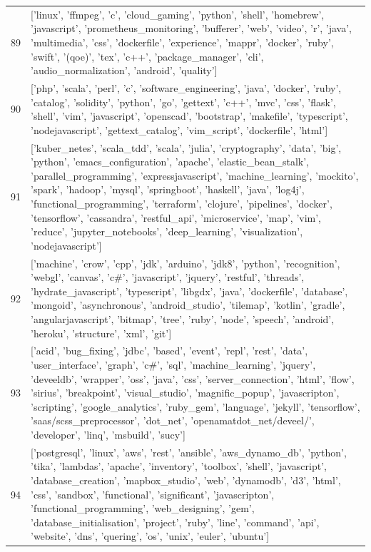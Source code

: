 \begin{center}
\begin{longtable}{|p{1.5cm}|p{12.5cm}|}
            89 & ['linux', 'ffmpeg', 'c', 'cloud\_gaming', 'python', 'shell', 'homebrew', 'javascript', 'prometheus\_monitoring', 'bufferer', 'web', 'video', 'r', 'java', 'multimedia', 'css', 'dockerfile', 'experience', 'mappr', 'docker', 'ruby', 'swift', '(qoe)', 'tex', 'c++', 'package\_manager', 'cli', 'audio\_normalization', 'android', 'quality']  \\ 
            90 & ['php', 'scala', 'perl', 'c', 'software\_engineering', 'java', 'docker', 'ruby', 'catalog', 'solidity', 'python', 'go', 'gettext', 'c++', 'mvc', 'css', 'flask', 'shell', 'vim', 'javascript', 'openscad', 'bootstrap', 'makefile', 'typescript', 'nodejavascript', 'gettext\_catalog', 'vim\_script', 'dockerfile', 'html']  \\ 
            91 & ['kuber\_netes', 'scala\_tdd', 'scala', 'julia', 'cryptography', 'data', 'big', 'python', 'emacs\_configuration', 'apache', 'elastic\_bean\_stalk', 'parallel\_programming', 'expressjavascript', 'machine\_learning', 'mockito', 'spark', 'hadoop', 'mysql', 'springboot', 'haskell', 'java', 'log4j', 'functional\_programming', 'terraform', 'clojure', 'pipelines', 'docker', 'tensorflow', 'cassandra', 'restful\_api', 'microservice', 'map', 'vim', 'reduce', 'jupyter\_notebooks', 'deep\_learning', 'visualization', 'nodejavascript']  \\ 
            92 & ['machine', 'crow', 'cpp', 'jdk', 'arduino', 'jdk8', 'python', 'recognition', 'webgl', 'canvas', 'c\#', 'javascript', 'jquery', 'restful', 'threads', 'hydrate\_javascript', 'typescript', 'libgdx', 'java', 'dockerfile', 'database', 'mongoid', 'asynchronous', 'android\_studio', 'tilemap', 'kotlin', 'gradle', 'angularjavascript', 'bitmap', 'tree', 'ruby', 'node', 'speech', 'android', 'heroku', 'structure', 'xml', 'git']  \\ 
            93 & ['acid', 'bug\_fixing', 'jdbc', 'based', 'event', 'repl', 'rest', 'data', 'user\_interface', 'graph', 'c\#', 'sql', 'machine\_learning', 'jquery', 'deveeldb', 'wrapper', 'oss', 'java', 'css', 'server\_connection', 'html', 'flow', 'sirius', 'breakpoint', 'visual\_studio', 'magnific\_popup', 'javascripton', 'scripting', 'google\_analytics', 'ruby\_gem', 'language', 'jekyll', 'tensorflow', 'saas/scss\_preprocessor', 'dot\_net', 'openamatdot\_net/deveel/', 'developer', 'linq', 'msbuild', 'sucy']  \\ 
            94 & ['postgresql', 'linux', 'aws', 'rest', 'ansible', 'aws\_dynamo\_db', 'python', 'tika', 'lambdas', 'apache', 'inventory', 'toolbox', 'shell', 'javascript', 'database\_creation', 'mapbox\_studio', 'web', 'dynamodb', 'd3', 'html', 'css', 'sandbox', 'functional', 'significant', 'javascripton', 'functional\_programming', 'web\_designing', 'gem', 'database\_initialisation', 'project', 'ruby', 'line', 'command', 'api', 'website', 'dns', 'quering', 'os', 'unix', 'euler', 'ubuntu']  \\ 

\end{longtable}
\end{center}
